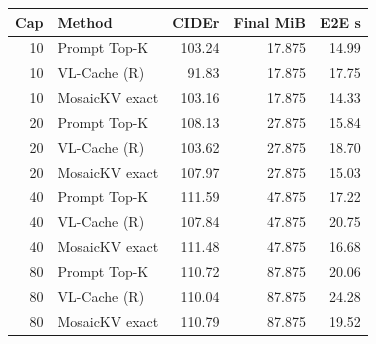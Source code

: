 \begin{tabular}{rlrrr}
\toprule
Cap & Method & CIDEr & Final MiB & E2E s\\\midrule
10 & Prompt Top-K & 103.24 & 17.875 & 14.99\\
10 & VL-Cache (R) & 91.83 & 17.875 & 17.75\\
10 & MosaicKV exact & 103.16 & 17.875 & 14.33\\
20 & Prompt Top-K & 108.13 & 27.875 & 15.84\\
20 & VL-Cache (R) & 103.62 & 27.875 & 18.70\\
20 & MosaicKV exact & 107.97 & 27.875 & 15.03\\
40 & Prompt Top-K & 111.59 & 47.875 & 17.22\\
40 & VL-Cache (R) & 107.84 & 47.875 & 20.75\\
40 & MosaicKV exact & 111.48 & 47.875 & 16.68\\
80 & Prompt Top-K & 110.72 & 87.875 & 20.06\\
80 & VL-Cache (R) & 110.04 & 87.875 & 24.28\\
80 & MosaicKV exact & 110.79 & 87.875 & 19.52\\
\bottomrule
\end{tabular}

